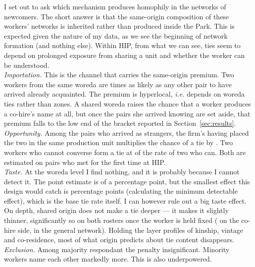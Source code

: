 \noindent I set out to ask which mechanism produces homophily in the networks of newcomers. The short answer is that  the same-origin composition of these workers' networks is inherited rather than produced inside the Park. This is expected given the nature of my data, as we see the beginning of network formation (and nothing else). Within HIP, from what we can see, ties seem to depend on prolonged exposure from sharing a unit and whether the worker can be understood. \\


\noindent \textit{Importation.} This is the channel that carries the same-origin premium. Two workers from the same woreda are \pnChanImportOriginRel{} times as likely as any other pair to have arrived already acquainted. The premium is hyperlocal, \textit{i.e.} depends on woreda ties rather than zones. A shared woreda raises the chance that a worker produces a co-hire's name at all, but once the pairs she arrived knowing are set aside, that premium falls to the low end of the bracket reported in Section~\ref{sec:results}. \\

\noindent \textit{Opportunity.} Among the pairs who arrived as strangers, the firm's having placed the two in the same production unit multiplies the chance of a tie by \pnChanOppUnitRel{}. Two workers who cannot converse form a tie at \pnChanOppKappa{} of the rate of two who can. Both are estimated on pairs who met for the first time at HIP. \\

\noindent \textit{Taste.} At the woreda level I find nothing, and it is probably because I cannot detect it. The point estimate is \pnChanTasteTauPp{} of a percentage point, but the smallest effect this design would catch is \pnChanTasteMdePp{} percentage points (calculating the minimum detectable effect), which is the base tie rate itself. I can however rule out a big taste effect. On depth, shared origin does not make a tie deeper — it makes it slightly thinner, significantly so on both rosters once the worker is held fixed (\pnMuxOriginCohire{} on the co-hire side, \pnMuxOriginGn{} in the general network). Holding the layer profiles of kinship, vintage and co-residence, most of what origin predicts about tie content disappears. \\

\noindent \textit{Exclusion.} Among majority respondant the penalty insignificant. Minority workers name each other markedly more. This is also underpowered.

